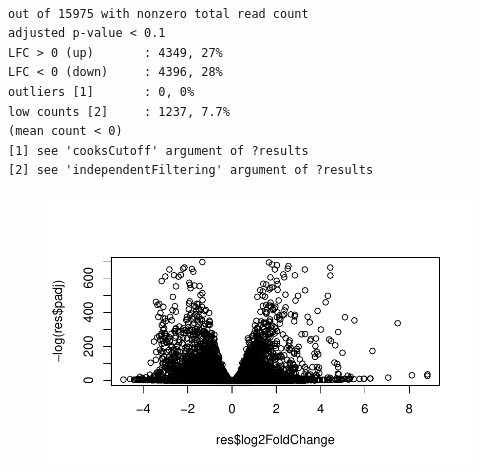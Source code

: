 \documentclass[
  letterpaper,
  DIV=11,
  numbers=noendperiod]{scrartcl}
\newenvironment{Shaded}{\begin{snugshade}}{\end{snugshade}}
\newcommand{\FunctionTok}[1]{\textcolor[rgb]{0.28,0.35,0.67}{#1}}
\newcommand{\NormalTok}[1]{\textcolor[rgb]{0.00,0.23,0.31}{#1}}
\newcommand{\SpecialCharTok}[1]{\textcolor[rgb]{0.37,0.37,0.37}{#1}}
\begin{document}
\begin{verbatim}

out of 15975 with nonzero total read count
adjusted p-value < 0.1
LFC > 0 (up)       : 4349, 27%
LFC < 0 (down)     : 4396, 28%
outliers [1]       : 0, 0%
low counts [2]     : 1237, 7.7%
(mean count < 0)
[1] see 'cooksCutoff' argument of ?results
[2] see 'independentFiltering' argument of ?results
\end{verbatim}

\begin{Shaded}
\end{Shaded}

\begin{figure}[H]

{\centering \includegraphics{class_13_files/figure-pdf/unnamed-chunk-10-1.pdf}

}

\end{figure}
\end{document}

